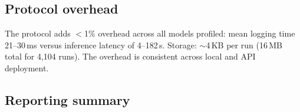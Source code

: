 \documentclass[sn-nature]{sn-jnl}
\begin{document}
\begin{table}[h]
\caption{\textbf{Mapping of non-determinism mechanisms to deployment stacks.}
Symbols: \checkmark, present and verifiable; ``likely'', consistent with public documentation and standard production practice; ``possible'', plausible but not confirmed; ---, absent or strongly mitigated; $\triangle$, present in principle but mitigated by design (single-GPU integer arithmetic).
For closed-source stacks, attribution is necessarily inferential.}\label{tab:mechanisms}
\footnotesize
\setlength{\tabcolsep}{4pt}
\end{table}


\subsection{Protocol overhead}\label{subsec:overhead}

The protocol adds $<$1\% overhead across all models profiled: mean logging time 21--30\,ms versus inference latency of 4--182\,s.
Storage: $\sim$4\,KB per run (16\,MB total for 4{,}104 runs).
The overhead is consistent across local and API deployment.


\subsection{Reporting summary}\label{subsec:reporting}
\end{document}
